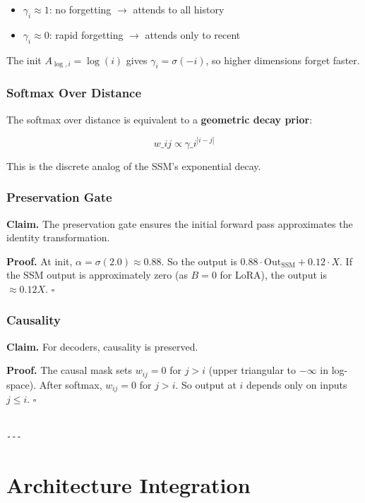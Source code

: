 \begin{itemize}
\item $\gamma_i \approx 1$: no forgetting $\to$ attends to all history
\item $\gamma_i \approx 0$: rapid forgetting $\to$ attends only to recent

\end{itemize}
The init $A_{\log, i} = \log(i)$ gives $\gamma_i = \sigma(-i)$, so higher 
dimensions forget faster.

\subsubsection{Softmax Over Distance}

The softmax over distance is equivalent to a \textbf{geometric decay prior}:

\[
w\_{ij} \propto \gamma\_i^{|i - j|}
\tag{4.16}
\]

This is the discrete analog of the SSM's exponential decay.

\subsubsection{Preservation Gate}

\textbf{Claim.} The preservation gate ensures the initial forward pass approximates 
the identity transformation.

\textbf{Proof.} At init, $\alpha = \sigma(2.0) \approx 0.88$. So the output is 
$0.88 \cdot \text{Out}_\text{SSM} + 0.12 \cdot X$. If the SSM output is 
approximately zero (as $B = 0$ for LoRA), the output is $\approx 0.12 X$. 
$\square$

\subsubsection{Causality}

\textbf{Claim.} For decoders, causality is preserved.

\textbf{Proof.} The causal mask sets $w_{ij} = 0$ for $j > i$ (upper triangular 
to $-\infty$ in log-space). After softmax, $w_{ij} = 0$ for $j > i$. So 
output at $i$ depends only on inputs $j \leq i$. $\square$
\begin{lstlisting}

---
\end{lstlisting}

\section{Architecture Integration}

